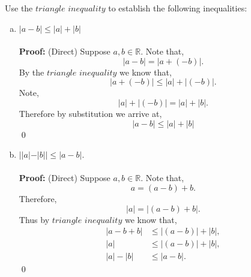 \documentclass[12pt]{article}
\makeatletter
\theoremstyle{homework}
\newenvironment{exercise}[1]
{\def\@currentlabel{#1}\exercisecore}
{\endexercisecore}
\newcommand{\Reals}{\ensuremath{\mathbb R}}
\let\RR\Reals
\makeatother
\begin{document}
\begin{exercise}{1.2.6}
Use the $triangle$ $inequality$ to establish the following inequalities:
\begin{enumerate}[(a)]
\item $|a-b| \leq |a| + |b|$\\\\
\textbf{Proof:} (Direct) Suppose $a,b \in \RR$. Note that, 
\begin{equation*}
  |a-b| = |a + (-b)|.
\end{equation*}
By the $triangle$ $inequality$ we know that,
\begin{equation*}
  |a + (-b)| \leq |a| + |(-b)|.
\end{equation*}
Note,
\begin{equation*}
  |a| + |(-b)| = |a| + |b|.
\end{equation*}
Therefore by substitution we arrive at,
\begin{equation*}
  |a-b| \leq |a| + |b|
\end{equation*}
 \qed


 \item $||a|-|b|| \le |a-b|$.\\\\
 \textbf{Proof:} (Direct) Suppose $a,b \in \RR$. Note that, 
 \begin{equation*}
  a = (a-b) + b.
\end{equation*}
Therefore,
\begin{equation*}
  |a| = |(a-b) + b|.
\end{equation*}
Thus by $triangle$ $inequality$ we know that,
\begin{align*}
  |a-b+b| &\leq |(a-b)| + |b|,\\
  |a| &\leq |(a-b)| + |b|,\\
  |a| - |b| &\leq |a-b|.
\end{align*}
\qed
\end{enumerate}
\end{exercise}
\end{document}
